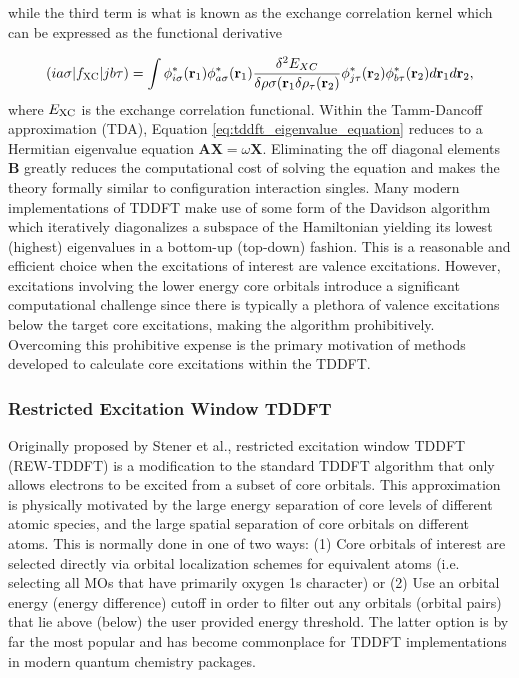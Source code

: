 \documentclass{article}
\begin{document}
while the third term is what is known as the exchange correlation kernel which can be expressed as the functional derivative

\begin{equation}
(ia\sigma|f_{\rm XC}|jb\tau) = \int \phi^*_{i\sigma}(\mathbf{r}_1)  \phi^*_{a\sigma}(\mathbf{r}_1) \frac{\delta^2 E_{XC}}{\delta \rho{\sigma}(\mathbf{r}_1 \delta \rho_{\tau}(\mathbf{r}_2)} \phi^*_{j\tau}(\mathbf{r}_2) \phi^*_{b\tau}(\mathbf{r}_2) d\mathbf{r}_1 d\mathbf{r}_2,
\end{equation}
where $E_{\rm XC}$ is the exchange correlation functional. Within the Tamm-Dancoff approximation (TDA),\cite{fetter_quantum_1971} Equation \ref{eq:tddft_eigenvalue_equation} reduces to a Hermitian eigenvalue equation $\mathbf{A}\mathbf{X} = \omega\mathbf{X}$. Eliminating the off diagonal elements $\mathbf{B}$ greatly reduces the computational cost of solving the equation and makes the theory formally similar to configuration interaction singles. Many modern implementations of TDDFT make use of some form of the Davidson algorithm which iteratively diagonalizes a subspace of the Hamiltonian yielding its lowest (highest) eigenvalues in a bottom-up (top-down) fashion. This is a reasonable and efficient choice when the excitations of interest are valence excitations. However, excitations involving the lower energy core orbitals introduce a significant computational challenge since there is typically a plethora of valence excitations below the target core excitations, making the algorithm prohibitively. Overcoming this prohibitive expense is the primary motivation of methods developed to calculate core excitations within the TDDFT. 
\subsubsection{Restricted Excitation Window TDDFT}
Originally proposed by Stener et al.,\cite{stener_time_2003} restricted excitation window TDDFT (REW-TDDFT) is a modification to the standard TDDFT algorithm that only allows electrons to be excited from a subset of core orbitals. \cite{imamura_time-dependent_2006,besley_time-dependent_2007} This approximation is physically motivated by the large energy separation of core levels of different atomic species, and the large spatial separation of core orbitals on different atoms. This is normally done in one of two ways: (1) Core orbitals of interest are selected directly via orbital localization schemes for equivalent atoms (i.e. selecting all MOs that have primarily oxygen 1s character) or (2) Use an orbital energy (energy difference) cutoff in order to filter out any orbitals (orbital pairs) that lie above (below) the user provided energy threshold. The latter option is by far the most popular and has become commonplace for TDDFT implementations in modern quantum chemistry packages. 
\end{document}
